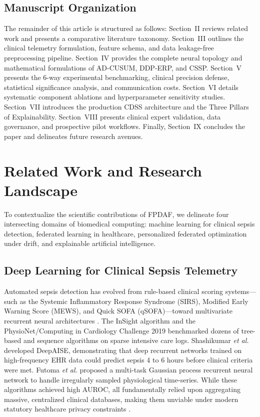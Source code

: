 \documentclass[journal,twocolumn,10pt]{IEEEtran}
\begin{document}
\subsection{Manuscript Organization}
The remainder of this article is structured as follows: Section~II reviews related work and presents a comparative literature taxonomy. Section~III outlines the clinical telemetry formulation, feature schema, and data leakage-free preprocessing pipeline. Section~IV provides the complete neural topology and mathematical formulations of AD-CUSUM, DDP-ERP, and CSSP. Section~V presents the 6-way experimental benchmarking, clinical precision defense, statistical significance analysis, and communication costs. Section~VI details systematic component ablations and hyperparameter sensitivity studies. Section~VII introduces the production CDSS architecture and the Three Pillars of Explainability. Section~VIII presents clinical expert validation, data governance, and prospective pilot workflows. Finally, Section~IX concludes the paper and delineates future research avenues.

\section{Related Work and Research Landscape}
To contextualize the scientific contributions of FPDAF, we delineate four intersecting domains of biomedical computing: machine learning for clinical sepsis detection, federated learning in healthcare, personalized federated optimization under drift, and explainable artificial intelligence.

\subsection{Deep Learning for Clinical Sepsis Telemetry}
Automated sepsis detection has evolved from rule-based clinical scoring systems—such as the Systemic Inflammatory Response Syndrome (SIRS), Modified Early Warning Score (MEWS), and Quick SOFA (qSOFA)—toward multivariate recurrent neural architectures \cite{singer2016sepsis3,desautels2016prediction}. The InSight algorithm \cite{desautels2016prediction} and the PhysioNet/Computing in Cardiology Challenge 2019 \cite{reyna2020physionet} benchmarked dozens of tree-based and sequence algorithms on sparse intensive care logs. Shashikumar \textit{et al.} \cite{shashikumar2021deepai} developed DeepAISE, demonstrating that deep recurrent networks trained on high-frequency EHR data could predict sepsis 4 to 6 hours before clinical criteria were met. Futoma \textit{et al.} \cite{futoma2017learning} proposed a multi-task Gaussian process recurrent neural network to handle irregularly sampled physiological time-series. While these algorithms achieved high AUROC, all fundamentally relied upon aggregating massive, centralized clinical databases, making them unviable under modern statutory healthcare privacy constraints \cite{kaissis2020trustworthy}.
\end{document}
